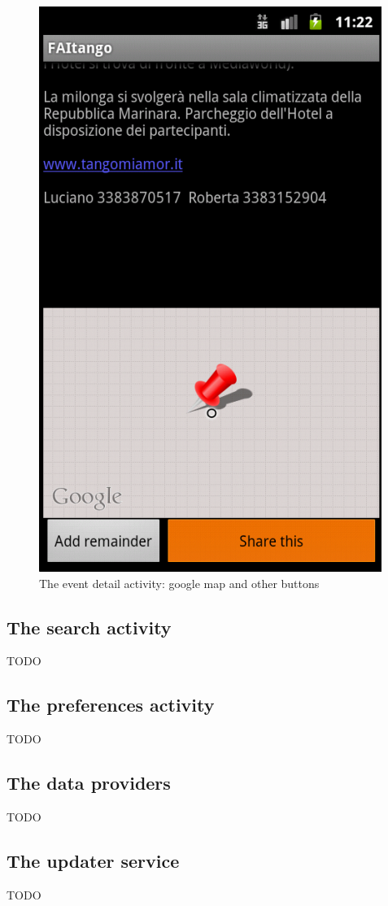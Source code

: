 \documentclass[12pt, twoside]{article}
\begin{document}
\begin{figure}[h]
\begin{center}
\includegraphics[scale=0.60]{fig/event-detail-down.png}
\end{center}
\caption{The event detail activity: google map and other buttons}
\label{fig:eventdetaildown}
\end{figure}

\subsection{The search activity}
TODO

\subsection{The preferences activity}
TODO

\subsection{The data providers}
TODO

\subsection{The updater service}

TODO
\end{document}
